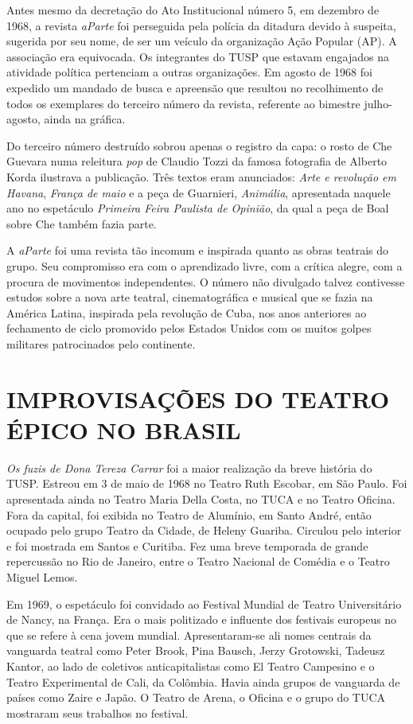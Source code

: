 Antes mesmo da decretação do Ato Institucional número 5, em dezembro de
1968, a revista \textit{aParte} foi perseguida pela polícia da ditadura
devido à suspeita, sugerida por seu nome, de ser um veículo da
organização Ação Popular (AP). A associação era equivocada. Os
integrantes do TUSP que estavam engajados na atividade política
pertenciam a outras organizações. Em agosto de 1968 foi expedido um
mandado de busca e apreensão que resultou no recolhimento de todos os
exemplares do terceiro número da revista, referente ao bimestre
julho-agosto, ainda na gráfica.

Do terceiro número destruído sobrou apenas o registro da capa: o rosto
de Che Guevara numa releitura \textit{pop} de Claudio Tozzi da famosa
fotografia de Alberto Korda ilustrava a publicação. Três textos eram
anunciados: \textit{Arte e revolução em Havana}, \textit{França de maio} e a
peça de Guarnieri, \textit{Animália}, apresentada naquele ano no espetáculo
\textit{Primeira Feira Paulista de Opinião}, da qual a peça de Boal sobre
Che também fazia parte.

A \textit{aParte} foi uma revista tão incomum e inspirada quanto as obras
teatrais do grupo. Seu compromisso era com o aprendizado livre, com a
crítica alegre, com a procura de movimentos independentes. O número não
divulgado talvez contivesse estudos sobre a nova arte teatral,
cinematográfica e musical que se fazia na América Latina, inspirada pela
revolução de Cuba, nos anos anteriores ao fechamento de ciclo promovido
pelos Estados Unidos com os muitos golpes militares patrocinados pelo
continente.

\chapter{IMPROVISAÇÕES DO TEATRO ÉPICO NO BRASIL}

\textit{Os fuzis de Dona Tereza Carrar} foi a maior realização da breve
história do TUSP. Estreou em 3 de maio de 1968 no Teatro Ruth Escobar,
em São Paulo. Foi apresentada ainda no Teatro Maria Della Costa, no TUCA
e no Teatro Oficina. Fora da capital, foi exibida no Teatro de Alumínio,
em Santo André, então ocupado pelo grupo Teatro da Cidade, de Heleny
Guariba. Circulou pelo interior e foi mostrada em Santos e Curitiba. Fez
uma breve temporada de grande repercussão no Rio de Janeiro, entre o
Teatro Nacional de Comédia e o Teatro Miguel Lemos.

Em 1969, o espetáculo foi convidado ao Festival Mundial de Teatro
Universitário de Nancy, na França. Era o mais politizado e influente dos
festivais europeus no que se refere à cena jovem mundial.
Apresentaram-se ali nomes centrais da vanguarda teatral como Peter
Brook, Pina Bausch, Jerzy Grotowski, Tadeusz Kantor, ao lado de
coletivos anticapitalistas como El Teatro Campesino e o Teatro
Experimental de Cali, da Colômbia. Havia ainda grupos de vanguarda de
países como Zaire e Japão. O Teatro de Arena, o Oficina e o grupo do
TUCA mostraram seus trabalhos no festival.

